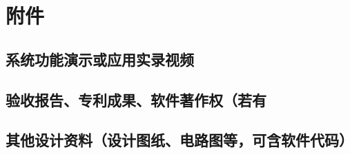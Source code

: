 	\section{附件} %
	\label{sec:附件}
		\subsection{系统功能演示或应用实录视频} %
		\label{sub:系统功能演示或应用实录视频}
		
		\newpage

		\subsection{验收报告、专利成果、软件著作权（若有} %
		\label{sub:验收报告_专利成果_软件著作权_若有}
		
		\newpage

		\subsection{其他设计资料（设计图纸、电路图等，可含软件代码）} %
		\label{sub:其他设计资料_设计图纸_电路图等_可含软件代码_}
		

